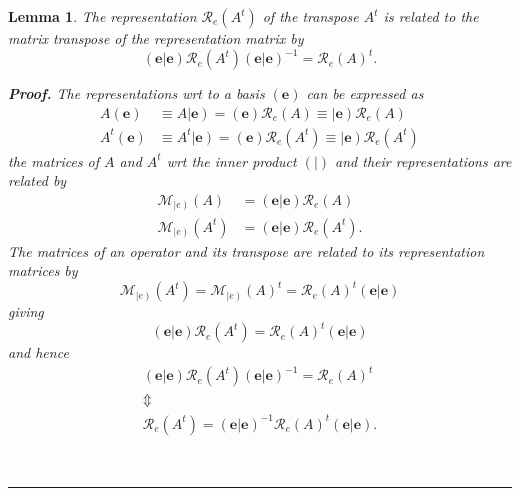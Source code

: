 \documentclass[aps,preprint]{revtex4}%
\newtheorem{lemma}[theorem]{Lemma}
\newenvironment{proof}[1][Proof]{\noindent\textbf{#1.} }{\ \rule{0.5em}{0.5em}}
\begin{document}
\begin{lemma}
The representation $\mathcal{R}_{e}\left(  A^{t}\right)  $ of the transpose
$A^{t}$ is related to the matrix transpose of the representation matrix by
\begin{equation}
\left(  \left.  \mathbf{e}\right\vert \mathbf{e}\right)  \mathcal{R}%
_{e}\left(  A^{t}\right)  \left(  \left.  \mathbf{e}\right\vert \mathbf{e}%
\right)  ^{-1}=\mathcal{R}_{e}\left(  A\right)  ^{t}.
\end{equation}


\begin{proof}
The representations wrt to a basis $\left(  \mathbf{e}\right)  $ can be
expressed as
\begin{align}
A\left(  \mathbf{e}\right)   &  \equiv A\left\vert \mathbf{e}\right)  =\left(
\mathbf{e}\right)  \mathcal{R}_{e}\left(  A\right)  \equiv\left\vert
\mathbf{e}\right)  \mathcal{R}_{e}\left(  A\right) \\
A^{t}\left(  \mathbf{e}\right)   &  \equiv A^{t}\left\vert \mathbf{e}\right)
=\left(  \mathbf{e}\right)  \mathcal{R}_{e}\left(  A^{t}\right)
\equiv\left\vert \mathbf{e}\right)  \mathcal{R}_{e}\left(  A^{t}\right)
\end{align}
the matrices of $A$ and $A^{t}$ wrt the inner product $\left(  \left.
{}\right\vert \right)  $ and their representations are related by
\begin{align}
\mathcal{M}_{\left\vert e\right)  }\left(  A\right)   &  =\left(  \left.
\mathbf{e}\right\vert \mathbf{e}\right)  \mathcal{R}_{e}\left(  A\right) \\
\mathcal{M}_{\left\vert e\right)  }\left(  A^{t}\right)   &  =\left(  \left.
\mathbf{e}\right\vert \mathbf{e}\right)  \mathcal{R}_{e}\left(  A^{t}\right)
.
\end{align}
The matrices of an operator and its transpose are related to its
representation matrices by
\begin{equation}
\mathcal{M}_{\left\vert e\right)  }\left(  A^{t}\right)  =\mathcal{M}%
_{\left\vert e\right)  }\left(  A\right)  ^{t}=\mathcal{R}_{e}\left(
A\right)  ^{t}\left(  \left.  \mathbf{e}\right\vert \mathbf{e}\right)
\end{equation}
giving
\begin{equation}
\left(  \left.  \mathbf{e}\right\vert \mathbf{e}\right)  \mathcal{R}%
_{e}\left(  A^{t}\right)  =\mathcal{R}_{e}\left(  A\right)  ^{t}\left(
\left.  \mathbf{e}\right\vert \mathbf{e}\right)
\end{equation}
and hence%
\begin{gather}
\left(  \left.  \mathbf{e}\right\vert \mathbf{e}\right)  \mathcal{R}%
_{e}\left(  A^{t}\right)  \left(  \left.  \mathbf{e}\right\vert \mathbf{e}%
\right)  ^{-1}=\mathcal{R}_{e}\left(  A\right)  ^{t}\\
\Updownarrow\\
\mathcal{R}_{e}\left(  A^{t}\right)  =\left(  \left.  \mathbf{e}\right\vert
\mathbf{e}\right)  ^{-1}\mathcal{R}_{e}\left(  A\right)  ^{t}\left(  \left.
\mathbf{e}\right\vert \mathbf{e}\right)  .
\end{gather}

\end{proof}
\end{lemma}
\end{document}
